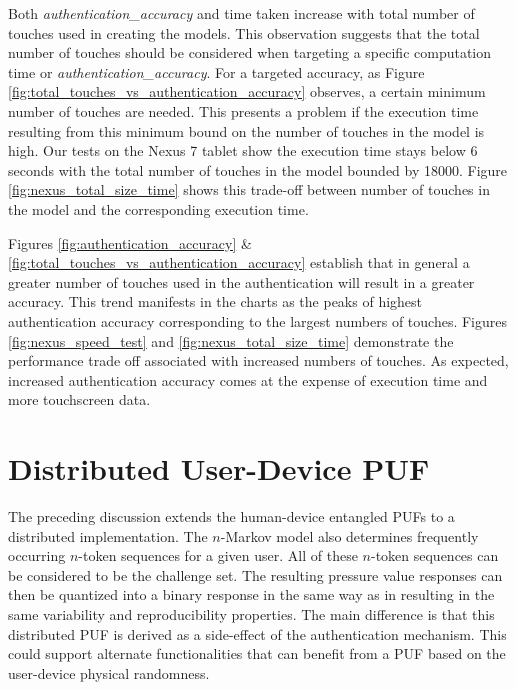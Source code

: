 \documentclass{acm_proc_article-sp}
\begin{document}
Both {\it authentication\_accuracy} and time taken 
increase with total number of touches used in creating the models.
This observation suggests that the total number of touches
should be considered when targeting 
a specific computation time or {\it authentication\_accuracy}.
%
%
For a targeted accuracy, 
as Figure \ref{fig:total_touches_vs_authentication_accuracy} observes,
a certain minimum number of touches are needed.
This presents a problem if the execution time
resulting from this minimum bound on the
number of touches in the model is high. 
Our tests  on the Nexus 7 tablet show the execution time stays below 6 seconds
with the total number of touches in the model bounded by 18000.
Figure \ref{fig:nexus_total_size_time} shows this trade-off between number of touches
in the model and the corresponding execution time.

Figures \ref{fig:authentication_accuracy}  \& \ref{fig:total_touches_vs_authentication_accuracy}
establish that in general a greater number of touches used 
in the authentication will result in a greater accuracy. 
This trend manifests in the charts as the peaks of highest authentication accuracy  
corresponding to the largest numbers of touches. 
Figures \ref{fig:nexus_speed_test} and \ref{fig:nexus_total_size_time} 
demonstrate the performance trade off associated with increased numbers of touches. 
As expected, increased authentication accuracy 
comes at the expense of execution time and more touchscreen data.

\section{Distributed User-Device PUF}
\label{sec:PUF}
The preceding discussion extends the human-device entangled PUFs \cite{ScheelTyagi15} to a distributed implementation. 
The $n$-Markov model also determines frequently occurring $n$-token sequences for a
given user.
All of these $n$-token sequences can be considered to be the challenge set.
The resulting pressure value responses 
can then be quantized into a binary response in the same way as in 
\cite{ScheelTyagi15} resulting in the same variability and reproducibility properties. The main 
difference is that this distributed PUF is derived 
as a side-effect of the authentication mechanism.
This could support alternate functionalities that can benefit from a PUF based on the user-device physical randomness.
\end{document}
